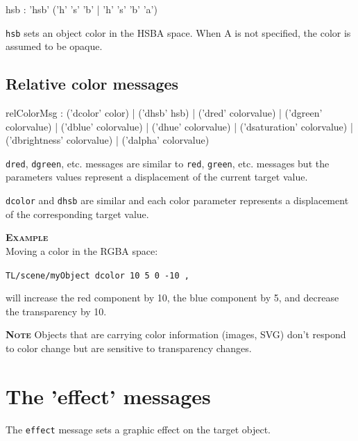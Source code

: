 \documentclass[a4paper,twoside]{report}
\newcommand{\sublevel}[1]	{\section{#1}}
\newcommand{\subsublevel}[1]	{\subsection{#1}}
\newcommand{\OSC}[1]		{\texttt{#1}}
\newcommand{\example}		{\textbf{\hspace{-1.5cm}\textbf{\textsc{Example }}}}
\newcommand{\note}	[1]		{\vspace{2mm}\textbf{\hspace{-1.03cm}\textbf{\textsc{Note #1}}}}
\let\olditemize\itemize
\let\oldenditemize\enditemize
\renewenvironment{itemize} 	{\olditemize \setlength{\itemsep}{1mm}}{\oldenditemize}
\newcommand{\sample}	[1]			{\vspace{-2mm}\begin{center}\colorbox{mygrey}{
								\begin{minipage}[t]{0.9\columnwidth} 
								{\small \texttt{#1}}
								\end{minipage}}\end{center}}
\newcommand{\sampleindent}	{ \hspace{0.5cm} }
\begin{document}
\begin{rail}
hsb :		'hsb' ('h' 's' 'b' | 'h' 's' 'b' 'a') 
\end{rail}

\OSC{hsb} sets an object color in the HSBA space. 
When A is not specified, the color is assumed to be opaque. 



\subsublevel{Relative color messages}
\label{relcolormsg}

\begin{rail}
relColorMsg :  
		 	('dcolor' color) 
		| 	('dhsb' hsb) 
		| 	('dred' colorvalue) 
		| 	('dgreen' colorvalue) 
		| 	('dblue' colorvalue) 
		| 	('dhue' colorvalue) 
		| 	('dsaturation' colorvalue) 
		| 	('dbrightness' colorvalue) 
		| 	('dalpha' colorvalue) 
\end{rail}

\begin{itemize}
\item \OSC{dred}, \OSC{dgreen}, etc. messages are similar to \OSC{red}, \OSC{green}, etc. messages but the parameters values represent a displacement of the current target value.
\item \OSC{dcolor} and \OSC{dhsb} are similar and each color parameter represents a displacement of the corresponding target value.
\end{itemize}

\example \\
Moving a color in the RGBA space:
\sample{TL/scene/myObject dcolor 10 5 0 -10 ,}
\sampleindent will increase the red component by 10, the blue component by 5, and decrease the transparency by 10.

\note{} Objects that are carrying color information (images, SVG) don't respond to color change but are sensitive to transparency changes.


\sublevel{The 'effect' messages}
\label{effectmsg}

The \OSC{effect} message sets a graphic effect on the target object.
\end{document}
